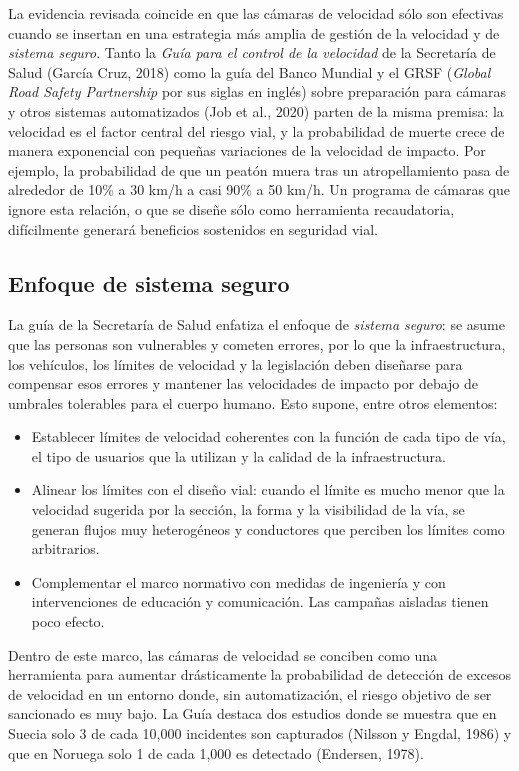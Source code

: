 \noindent La evidencia revisada coincide en que las cámaras de velocidad sólo son efectivas cuando se insertan en una estrategia más amplia de gestión de la velocidad y de \emph{sistema seguro}. Tanto la \emph{Guía para el control de la velocidad} de la Secretaría de Salud (García Cruz, 2018) como la guía del Banco Mundial y el GRSF (\emph{Global Road Safety Partnership} por sus siglas en inglés) sobre preparación para cámaras y otros sistemas automatizados (Job et al., 2020) parten de la misma premisa: la velocidad es el factor central del riesgo vial, y la probabilidad de muerte crece de manera exponencial con pequeñas variaciones de la velocidad de impacto. Por ejemplo, la probabilidad de que un peatón muera tras un atropellamiento pasa de alrededor de 10\% a 30 km/h a casi 90\% a 50 km/h. Un programa de cámaras que ignore esta relación, o que se diseñe sólo como herramienta recaudatoria, difícilmente generará beneficios sostenidos en seguridad vial.\\

\subsection{Enfoque de sistema seguro}

\noindent La guía de la Secretaría de Salud enfatiza el enfoque de \emph{sistema seguro}: se asume que las personas son vulnerables y cometen errores, por lo que la infraestructura, los vehículos, los límites de velocidad y la legislación deben diseñarse para compensar esos errores y mantener las velocidades de impacto por debajo de umbrales tolerables para el cuerpo humano. Esto supone, entre otros elementos:

\begin{itemize}
    \item Establecer límites de velocidad coherentes con la función de cada tipo de vía, el tipo de usuarios que la utilizan y la calidad de la infraestructura.
    \item Alinear los límites con el diseño vial: cuando el límite es mucho menor que la velocidad sugerida por la sección, la forma y la visibilidad de la vía, se generan flujos muy heterogéneos y conductores que perciben los límites como arbitrarios.
    \item Complementar el marco normativo con medidas de ingeniería y con intervenciones de educación y comunicación. Las campañas aisladas tienen poco efecto.
\end{itemize}

Dentro de este marco, las cámaras de velocidad se conciben como una herramienta para aumentar drásticamente la probabilidad de detección de excesos de velocidad en un entorno donde, sin automatización, el riesgo objetivo de ser sancionado es muy bajo. La Guía destaca dos estudios donde se muestra que en Suecia solo 3 de cada 10,000 incidentes son capturados (Nilsson y Engdal, 1986) y que en Noruega solo 1 de cada 1,000 es detectado (Endersen, 1978).\\

